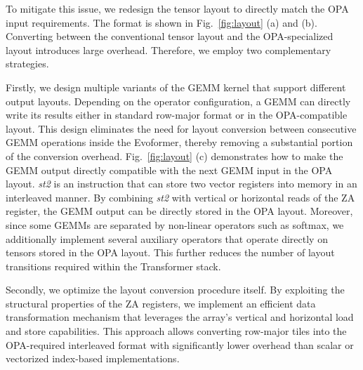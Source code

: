 To mitigate this issue, we redesign the tensor layout to directly match the OPA input requirements. The format is shown in Fig.~\ref{fig:layout} (a) and (b).
Converting between the conventional tensor layout and the OPA-specialized layout introduces large overhead. Therefore, we employ two complementary strategies.

Firstly, we design multiple variants of the GEMM kernel that support different output layouts. Depending on the operator configuration, a GEMM can directly write its results either in standard row-major format or in the OPA-compatible layout. This design eliminates the need for layout conversion between consecutive GEMM operations inside the Evoformer, thereby removing a substantial portion of the conversion overhead.
Fig.~\ref{fig:layout} (c) demonstrates how to make the GEMM output directly compatible with the next GEMM input in the OPA layout. \textit{st2} is an instruction that can store two vector registers into memory in an interleaved manner. By combining \textit{st2} with vertical or horizontal reads of the ZA register, the GEMM output can be directly stored in the OPA layout.
Moreover, since some GEMMs are separated by non-linear operators such as softmax, we additionally implement several auxiliary operators that operate directly on tensors stored in the OPA layout. This further reduces the number of layout transitions required within the Transformer stack.

Secondly, we optimize the layout conversion procedure itself. By exploiting the structural properties of the ZA registers, we implement an efficient data transformation mechanism that leverages the array's vertical and horizontal load and store capabilities. This approach allows converting row-major tiles into the OPA-required interleaved format with significantly lower overhead than scalar or vectorized index-based implementations.



